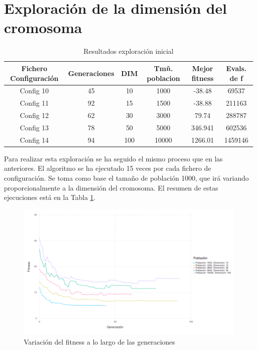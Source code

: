 \section{Exploración de la dimensión del cromosoma}

\begin{table}[]
    \centering
    \begin{tabular}{||c|c|c|c|c|c||}
        \hline
        \textbf{Fichero Configuración} & \textbf{Generaciones} & \textbf{DIM} & \textbf{Tmñ. poblacion} & \textbf{Mejor fitness} & \textbf{Evals. de f}\\ \hline
        Config 10  & 45   & 10    & 1000   & -38.48    &  69537    \\ \hline
        Config 11  & 92   & 15    & 1500   & -38.88    &  211163   \\ \hline
        Config 12  & 62   & 30    & 3000   & 79.74     &  288787   \\ \hline
        Config 13  & 78   & 50    & 5000   & 346.941   &  602536   \\ \hline
        Config 14  & 94   & 100   & 10000  & 1266.01   &  1459146  \\ \hline
    \end{tabular}
    \caption{Resultados exploración inicial}
    \label{tab:exploracion_dim_cromosoma}
\end{table}

Para realizar esta exploración se ha seguido el mismo proceso que en las anteriores. El algoritmo se ha ejecutado 15 veces por cada fichero de configuración.
Se toma como base el tamaño de población 1000, que irá variando proporcionalmente a la dimensión del cromosoma. El resumen de estas ejecuciones está en la 
Tabla \ref{tab:exploracion_dim_cromosoma}. 

\begin{figure}[]
	\centering	
	\includegraphics[scale=0.5]{figuras/ps_cd_variation.png}
	\caption{ Variación del fitness a lo largo de las generaciones }
    \label{fig:exec_summary}
\end{figure}

